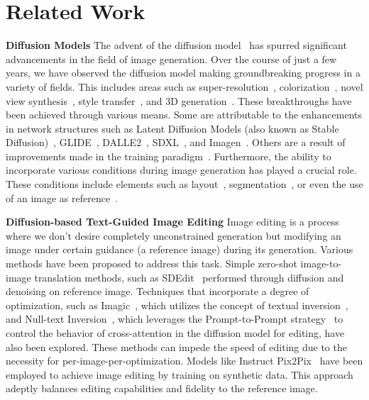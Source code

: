 \section{Related Work}
\label{sec:related}

\textbf{Diffusion Models}
The advent of the diffusion model~\cite{sohl2015deep,ddpm} has spurred significant advancements in the field of image generation. Over the course of just a few years, we have observed the diffusion model making groundbreaking progress in a variety of fields. This includes areas such as super-resolution~\cite{saharia2022image}, colorization~\cite{saharia2022palette}, novel view synthesis~\cite{watson2022novel}, style transfer~\cite{zhang2023inversion}, and 3D generation~\cite{poole2022dreamfusion, tang2023make, cheng2023sdfusion}. These breakthroughs have been achieved through various means. Some are attributable to the enhancements in network structures such as Latent Diffusion Models (also known as Stable Diffusion)~\cite{ldm}, GLIDE~\cite{glide}, DALLE2~\cite{dalle2}, SDXL~\cite{podell2023sdxl}, and Imagen~\cite{imagen}. Others are a result of improvements made in the training paradigm~\cite{nichol2021improved,song2019generative,dhariwal2021diffusion,song2020score,ddim}. Furthermore, the ability to incorporate various conditions during image generation has played a crucial role. These conditions include elements such as layout~\cite{cheng2023layoutdiffuse,ldm}, segmentation~\cite{avrahami2023spatext,avrahami2022blended,balaji2022ediffi,yang2023paint}, or even the use of an image as reference~\cite{mou2023t2i,ruiz2023dreambooth,textualinversion}.

\textbf{Diffusion-based Text-Guided Image Editing} 
Image editing is a process where we don't desire completely unconstrained generation but modifying an image under certain guidance (\ie a reference image) during its generation. Various methods have been proposed to address this task. Simple zero-shot image-to-image translation methods, such as SDEdit~\cite{meng2021sdedit} performed through diffusion and denoising on reference image. Techniques that incorporate a degree of optimization, such as Imagic~\cite{kawar2023imagic}, which utilizes the concept of textual inversion~\cite{textualinversion}, and Null-text Inversion~\cite{mokady2023null}, which leverages the Prompt-to-Prompt strategy~\cite{prompt2prompt} to control the behavior of cross-attention in the diffusion model for editing, have also been explored. These methods can impede the speed of editing due to the necessity for per-image-per-optimization. Models like Instruct Pix2Pix~\cite{brooks2023instructpix2pix} have been employed to achieve image editing by training on synthetic data. This approach adeptly balances editing capabilities and fidelity to the reference image.


